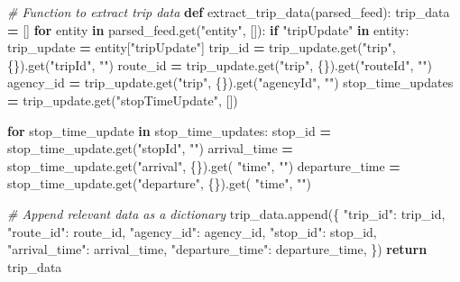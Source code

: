 \documentclass[
  12pt,
]{article}
\newenvironment{Shaded}{\begin{snugshade}}{\end{snugshade}}
\newcommand{\CommentTok}[1]{\textcolor[rgb]{0.56,0.35,0.01}{\textit{#1}}}
\newcommand{\ControlFlowTok}[1]{\textcolor[rgb]{0.13,0.29,0.53}{\textbf{#1}}}
\newcommand{\KeywordTok}[1]{\textcolor[rgb]{0.13,0.29,0.53}{\textbf{#1}}}
\newcommand{\NormalTok}[1]{#1}
\newcommand{\OperatorTok}[1]{\textcolor[rgb]{0.81,0.36,0.00}{\textbf{#1}}}
\newcommand{\StringTok}[1]{\textcolor[rgb]{0.31,0.60,0.02}{#1}}
\begin{document}
\begin{Shaded}
\begin{Highlighting}[]
\CommentTok{\# Function to extract trip data}
\KeywordTok{def}\NormalTok{ extract\_trip\_data(parsed\_feed):}
\NormalTok{    trip\_data }\OperatorTok{=}\NormalTok{ []}
    \ControlFlowTok{for}\NormalTok{ entity }\KeywordTok{in}\NormalTok{ parsed\_feed.get(}\StringTok{"entity"}\NormalTok{, []):}
        \ControlFlowTok{if} \StringTok{"tripUpdate"} \KeywordTok{in}\NormalTok{ entity:}
\NormalTok{            trip\_update }\OperatorTok{=}\NormalTok{ entity[}\StringTok{"tripUpdate"}\NormalTok{]}
\NormalTok{            trip\_id }\OperatorTok{=}\NormalTok{ trip\_update.get(}\StringTok{"trip"}\NormalTok{, \{\}).get(}\StringTok{"tripId"}\NormalTok{, }\StringTok{""}\NormalTok{)}
\NormalTok{            route\_id }\OperatorTok{=}\NormalTok{ trip\_update.get(}\StringTok{"trip"}\NormalTok{, \{\}).get(}\StringTok{"routeId"}\NormalTok{, }\StringTok{""}\NormalTok{)}
\NormalTok{            agency\_id }\OperatorTok{=}\NormalTok{ trip\_update.get(}\StringTok{"trip"}\NormalTok{, \{\}).get(}\StringTok{"agencyId"}\NormalTok{, }\StringTok{""}\NormalTok{)}
\NormalTok{            stop\_time\_updates }\OperatorTok{=}\NormalTok{ trip\_update.get(}\StringTok{"stopTimeUpdate"}\NormalTok{, [])}
            
            \ControlFlowTok{for}\NormalTok{ stop\_time\_update }\KeywordTok{in}\NormalTok{ stop\_time\_updates:}
\NormalTok{                stop\_id }\OperatorTok{=}\NormalTok{ stop\_time\_update.get(}\StringTok{"stopId"}\NormalTok{, }\StringTok{""}\NormalTok{)}
\NormalTok{                arrival\_time }\OperatorTok{=}\NormalTok{ stop\_time\_update.get(}\StringTok{"arrival"}\NormalTok{, \{\}).get(}
                  \StringTok{"time"}\NormalTok{, }\StringTok{""}\NormalTok{)}
\NormalTok{                departure\_time }\OperatorTok{=}\NormalTok{ stop\_time\_update.get(}\StringTok{"departure"}\NormalTok{, \{\}).get(}
                  \StringTok{"time"}\NormalTok{, }\StringTok{""}\NormalTok{)}
                
                \CommentTok{\# Append relevant data as a dictionary}
\NormalTok{                trip\_data.append(\{}
                    \StringTok{"trip\_id"}\NormalTok{: trip\_id,}
                    \StringTok{"route\_id"}\NormalTok{: route\_id,}
                    \StringTok{"agency\_id"}\NormalTok{: agency\_id,}
                    \StringTok{"stop\_id"}\NormalTok{: stop\_id,}
                    \StringTok{"arrival\_time"}\NormalTok{: arrival\_time,}
                    \StringTok{"departure\_time"}\NormalTok{: departure\_time,}
\NormalTok{                \})}
    \ControlFlowTok{return}\NormalTok{ trip\_data}


\end{Highlighting}
\end{Shaded}
\end{document}
